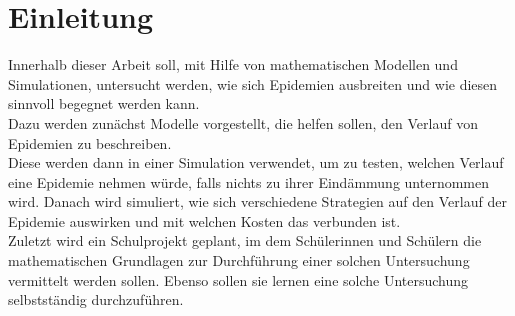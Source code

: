 \section{Einleitung}
\ellen
Innerhalb dieser Arbeit soll, mit Hilfe von mathematischen Modellen und Simulationen, untersucht werden, wie sich Epidemien ausbreiten und wie diesen sinnvoll begegnet werden kann.\\
Dazu werden zunächst Modelle vorgestellt, die helfen sollen, den Verlauf von Epidemien zu beschreiben.\\
Diese werden dann in einer Simulation verwendet, um zu testen, welchen Verlauf eine Epidemie nehmen würde, falls nichts zu ihrer Eindämmung unternommen wird. Danach wird simuliert, wie sich verschiedene Strategien auf den Verlauf der Epidemie auswirken und mit welchen Kosten das verbunden ist.\\
Zuletzt wird ein Schulprojekt geplant, im dem Schülerinnen und Schülern die mathematischen Grundlagen zur Durchführung einer solchen Untersuchung vermittelt werden sollen. Ebenso sollen sie lernen eine solche Untersuchung selbstständig durchzuführen. 